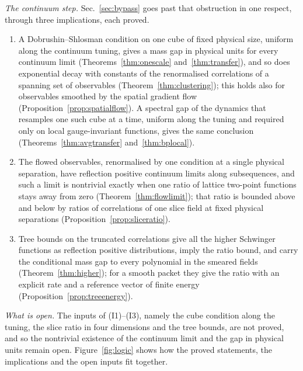 \documentclass[aps,prd,twocolumn,superscriptaddress,nofootinbib,longbibliography,floatfix,amsmath,amssymb,10pt]{revtex4-2}
\theoremstyle{definition}
\theoremstyle{remark}
\begin{document}
\emph{The continuum step.} Sec.~\ref{sec:bypass} goes past that obstruction
in one respect, through three implications, each proved.
\begin{enumerate}[label=\textup{(I\arabic*)},leftmargin=*]
\item A Dobrushin--Shlosman condition on one cube of fixed physical size,
uniform along the continuum tuning, gives a mass gap in physical units for
every continuum limit (Theorems~\ref{thm:onescale} and~\ref{thm:transfer}),
and so does exponential decay with constants of the renormalised
correlations of a spanning set of observables
(Theorem~\ref{thm:clustering}); this holds also for observables smoothed by
the spatial gradient flow
(Proposition~\ref{prop:spatialflow}). A spectral gap of the dynamics that
resamples one such cube at a time, uniform along the tuning and required
only on local gauge-invariant functions, gives the same conclusion
(Theorems~\ref{thm:avgtransfer} and~\ref{thm:bplocal}).
\item The flowed observables, renormalised by one condition at a single
physical separation, have reflection positive continuum limits along
subsequences, and such a limit is nontrivial exactly when one ratio of
lattice two-point functions stays away from zero
(Theorem~\ref{thm:flowlimit}); that ratio is bounded above and below by
ratios of correlations of one slice field at fixed physical separations
(Proposition~\ref{prop:sliceratio}).
\item Tree bounds on the truncated correlations give all the higher
Schwinger functions as reflection positive distributions, imply the ratio
bound, and carry the conditional mass gap to every polynomial in the
smeared fields (Theorem~\ref{thm:higher}); for a smooth packet they give the
ratio with an explicit rate and a reference vector of finite energy
(Proposition~\ref{prop:treeenergy}).
\end{enumerate}
\emph{What is open.} The inputs of (I1)--(I3), namely the cube condition
along the tuning, the slice ratio in four dimensions and the tree bounds,
are not proved, and so the nontrivial existence of the continuum limit and
the gap in physical units remain open. Figure~\ref{fig:logic} shows how the
proved statements, the implications and the open inputs fit together.
\end{document}
